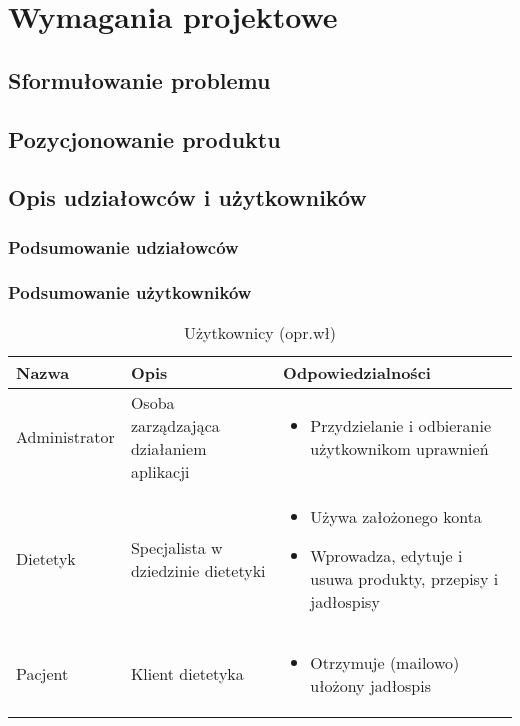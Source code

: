 \chapter{Wymagania projektowe}
\section{Sformułowanie problemu}
\section{Pozycjonowanie produktu}
\section{Opis udziałowców i użytkowników}
\subsection{Podsumowanie udziałowców}
\subsection{Podsumowanie użytkowników}

\begin{minipage}{\textwidth}
    \begin{table}[H]
        \centering\caption{Użytkownicy (opr.wł)\label{tabela:uzytkownicy}}
        \begin{tabular}{|p{}|p{}|p{}|}

            \hline
            Nazwa & Opis & Odpowiedzialności\\

            \hline
            Administrator &
            Osoba zarządzająca działaniem aplikacji &
            \begin{itemize}
                \item Przydzielanie i odbieranie użytkownikom uprawnień
            \end{itemize} \\
            \hline
            Dietetyk &
            Specjalista w dziedzinie dietetyki &
            \begin{itemize}
                \item Używa założonego konta
                \item Wprowadza, edytuje i usuwa produkty, przepisy i jadłospisy
            \end{itemize} \\
            \hline
            Pacjent &
            Klient dietetyka &
            \begin{itemize}
                \item Otrzymuje (mailowo) ułożony jadłospis
            \end{itemize} \\
            \hline
        \end{tabular}
    \end{table}
\end{minipage}

